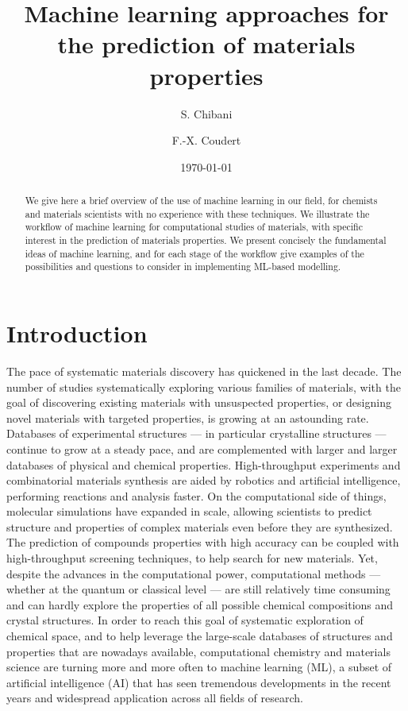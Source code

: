 \documentclass[aip,apm,amsmath,amssymb,reprint]{revtex4-2}
\begin{document}
\title{Machine learning approaches for the prediction of materials properties}

\author{S. Chibani}
\author{F.-X. Coudert}

\date{\today}

\begin{abstract}
We give here a brief overview of the use of machine learning in our field, for chemists and materials scientists with no experience with these techniques. We illustrate the workflow of machine learning for computational studies of materials, with specific interest in the prediction of materials properties. We present concisely the fundamental ideas of machine learning, and for each stage of the workflow give examples of the  possibilities and questions to consider in implementing ML-based modelling.
\end{abstract}

\maketitle

\section{Introduction}

The pace of systematic materials discovery has quickened in the last decade. The number of studies systematically exploring various families of materials, with the goal of discovering existing materials with unsuspected properties, or designing novel materials with targeted properties, is growing at an astounding rate. Databases of experimental structures --- in particular crystalline structures --- continue to grow at a steady pace, and are complemented with larger and larger databases of physical and chemical properties. High-throughput experiments and combinatorial materials synthesis are aided by robotics and artificial intelligence, performing reactions and analysis faster. On the computational side of things, molecular simulations have expanded in scale, allowing scientists to predict structure and properties of complex materials even before they are synthesized. The prediction of compounds properties with high accuracy can be coupled with high-throughput screening techniques, to help search for new materials. Yet, despite the advances in the computational power, computational methods --- whether at the quantum or classical level --- are still relatively time consuming and can hardly explore the properties of all possible chemical compositions and crystal structures. In order to reach this goal of systematic exploration of chemical space, and to help leverage the large-scale databases of structures and properties that are nowadays available, computational chemistry and materials science are turning more and more often to machine learning (ML), a subset of artificial intelligence (AI) that has seen tremendous developments in the recent years and widespread application across all fields of research.
\end{document}
